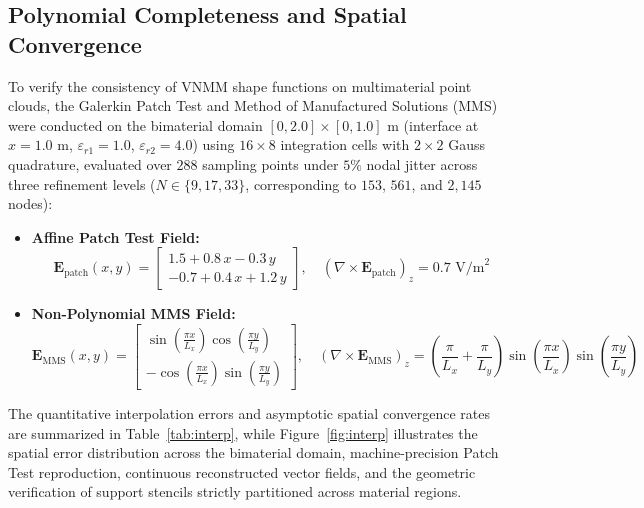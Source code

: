 \documentclass[11pt,a4paper]{article}
\begin{document}
\subsection{Polynomial Completeness and Spatial Convergence}
To verify the consistency of VNMM shape functions on multimaterial point clouds, the Galerkin Patch Test and Method of Manufactured Solutions (MMS) were conducted on the bimaterial domain $[0, 2.0] \times [0, 1.0]\text{ m}$ (interface at $x = 1.0\text{ m}$, $\varepsilon_{r1} = 1.0$, $\varepsilon_{r2} = 4.0$) using $16 \times 8$ integration cells with $2 \times 2$ Gauss quadrature, evaluated over $288$ sampling points under $5\%$ nodal jitter across three refinement levels ($N \in \{9, 17, 33\}$, corresponding to $153$, $561$, and $2,145$ nodes):
\begin{itemize}
  \item \textbf{Affine Patch Test Field:}
  \begin{equation}
  \mathbf{E}_{\mathrm{patch}}(x, y) = \begin{bmatrix} 1.5 + 0.8\,x - 0.3\,y \\ -0.7 + 0.4\,x + 1.2\,y \end{bmatrix}, \quad (\nabla \times \mathbf{E}_{\mathrm{patch}})_z = 0.7\text{ V/m}^2
  \end{equation}
  \item \textbf{Non-Polynomial MMS Field:}
  \begin{equation}
  \mathbf{E}_{\mathrm{MMS}}(x, y) = \begin{bmatrix} \sin\!\left(\frac{\pi x}{L_x}\right)\cos\!\left(\frac{\pi y}{L_y}\right) \\ -\cos\!\left(\frac{\pi x}{L_x}\right)\sin\!\left(\frac{\pi y}{L_y}\right) \end{bmatrix}, \quad (\nabla \times \mathbf{E}_{\mathrm{MMS}})_z = \left(\frac{\pi}{L_x} + \frac{\pi}{L_y}\right)\sin\!\left(\frac{\pi x}{L_x}\right)\sin\!\left(\frac{\pi y}{L_y}\right)
  \end{equation}
\end{itemize}

The quantitative interpolation errors and asymptotic spatial convergence rates are summarized in Table~\ref{tab:interp}, while Figure~\ref{fig:interp} illustrates the spatial error distribution across the bimaterial domain, machine-precision Patch Test reproduction, continuous reconstructed vector fields, and the geometric verification of support stencils strictly partitioned across material regions.
\end{document}
